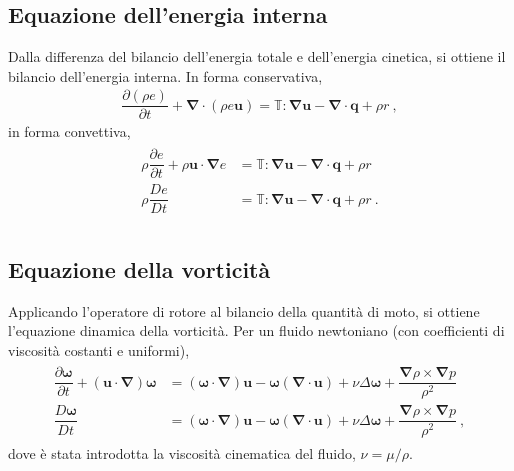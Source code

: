 \documentclass[letterpaper,10pt,italian]{jupyterBook}
\begin{document}
\subsection{Equazione dell’energia interna}
\label{\detokenize{polimi/fluidmechanics-ita/template/capitoli/04_bilanci/04teoria:equazione-dell-energia-interna}}
\sphinxAtStartPar
Dalla differenza del bilancio dell’energia totale e dell’energia
cinetica, si ottiene il bilancio dell’energia interna. In forma
conservativa,
\begin{equation*}
\begin{split}\dfrac{\partial (\rho e)}{\partial t} + \mathbf{\nabla} \cdot (\rho e \mathbf{u}) = \mathbb{T}:\mathbf{\nabla}\mathbf{u} - \mathbf{\nabla} \cdot \mathbf{q} + \rho r \ ,\end{split}
\end{equation*}
\sphinxAtStartPar
in forma convettiva,
\begin{equation*}
\begin{split}\begin{aligned}
   \rho \dfrac{\partial e}{\partial t} +  \rho \mathbf{u}  \cdot \mathbf{\nabla}e & =  \mathbb{T}:\mathbf{\nabla}\mathbf{u} - \mathbf{\nabla} \cdot \mathbf{q} + \rho r \\
   \rho \dfrac{D e}{D t} & =  \mathbb{T}:\mathbf{\nabla}\mathbf{u} - \mathbf{\nabla} \cdot \mathbf{q} + \rho r \ . \\ 
  \end{aligned}\end{split}
\end{equation*}

\subsection{Equazione della vorticità}
\label{\detokenize{polimi/fluidmechanics-ita/template/capitoli/04_bilanci/04teoria:equazione-della-vorticita}}
\sphinxAtStartPar
Applicando l’operatore di rotore al bilancio della quantità di moto, si
ottiene l’equazione dinamica della vorticità. Per un fluido newtoniano
(con coefficienti di viscosità costanti e uniformi),
\begin{equation*}
\begin{split}\begin{aligned}
 \dfrac{\partial \mathbf{\omega}}{\partial t} + (\mathbf{u} \cdot \mathbf{\nabla} ) \mathbf{\omega} & =
  (\mathbf{\omega} \cdot \mathbf{\nabla}) \mathbf{u} - \mathbf{\omega} (\mathbf{\nabla} \cdot \mathbf{u}) +
  \nu \Delta \mathbf{\omega} + \dfrac{\mathbf{\nabla} \rho \times \mathbf{\nabla} p}{\rho^2} \\
   \dfrac{D \mathbf{\omega}}{D t}  & =
  (\mathbf{\omega} \cdot \mathbf{\nabla}) \mathbf{u} - \mathbf{\omega} (\mathbf{\nabla} \cdot \mathbf{u}) +
  \nu \Delta \mathbf{\omega} + \dfrac{\mathbf{\nabla} \rho \times \mathbf{\nabla} p}{\rho^2} \ ,
 \end{aligned}\end{split}
\end{equation*}
\sphinxAtStartPar
dove è stata introdotta la viscosità cinematica del fluido,
\(\nu = \mu / \rho\).
\end{document}
